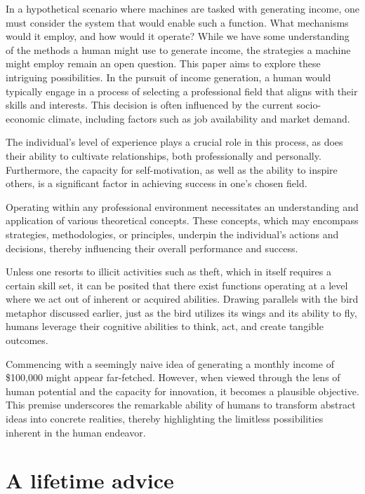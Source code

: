 \documentclass{article}
\begin{document}
In a hypothetical scenario where machines are tasked with generating income, one must consider the system that would enable such a function. What mechanisms would it employ, and how would it operate? While we have some understanding of the methods a human might use to generate income, the strategies a machine might employ remain an open question. This paper aims to explore these intriguing possibilities.
In the pursuit of income generation, a human would typically engage in a process of selecting a professional field that aligns with their skills and interests. This decision is often influenced by the current socio-economic climate, including factors such as job availability and market demand. 

The individual's level of experience plays a crucial role in this process, as does their ability to cultivate relationships, both professionally and personally. Furthermore, the capacity for self-motivation, as well as the ability to inspire others, is a significant factor in achieving success in one's chosen field.

Operating within any professional environment necessitates an understanding and application of various theoretical concepts. These concepts, which may encompass strategies, methodologies, or principles, underpin the individual's actions and decisions, thereby influencing their overall performance and success.

Unless one resorts to illicit activities such as theft, which in itself requires a certain skill set, it can be posited that there exist functions operating at a level where we act out of inherent or acquired abilities. Drawing parallels with the bird metaphor discussed earlier, just as the bird utilizes its wings and its ability to fly, humans leverage their cognitive abilities to think, act, and create tangible outcomes.

Commencing with a seemingly naive idea of generating a monthly income of \$100,000 might appear far-fetched. However, when viewed through the lens of human potential and the capacity for innovation, it becomes a plausible objective. This premise underscores the remarkable ability of humans to transform abstract ideas into concrete realities, thereby highlighting the limitless possibilities inherent in the human endeavor.

\section{A lifetime advice}
\end{document}
